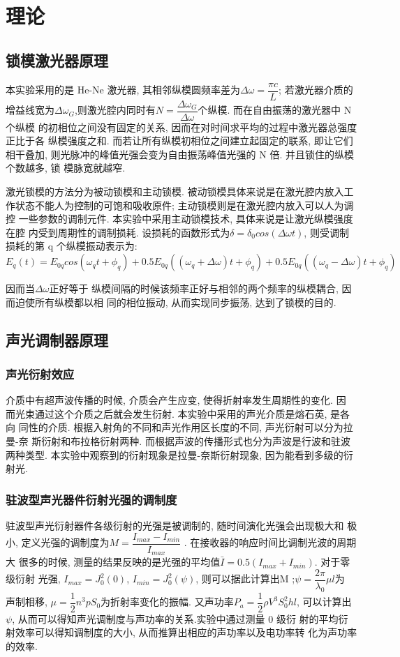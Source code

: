 \documentclass[aps,pre,12pt,preprint,%
	onecolumn,showpacs,showkeys,nofootinbib]{revtex4-2}
\begin{document}
\section{理论}
\subsection{锁模激光器原理}
本实验采用的是 He-Ne 激光器, 其相邻纵模圆频率差为$\Delta\omega=\dfrac{\pi c}{L}$; 若激光器介质的
增益线宽为$\Delta\omega_G$,则激光腔内同时有$N=\dfrac{\Delta\omega_G}{\Delta\omega}$个纵模. 而在自由振荡的激光器中 N 个纵模
的初相位之间没有固定的关系, 因而在对时间求平均的过程中激光器总强度正比于各
纵模强度之和. 而若让所有纵模初相位之间建立起固定的联系, 即让它们相干叠加,
则光脉冲的峰值光强会变为自由振荡峰值光强的 N 倍. 并且锁住的纵模个数越多, 锁
模脉宽就越窄.
\par 激光锁模的方法分为被动锁模和主动锁模. 被动锁模具体来说是在激光腔内放入工
作状态不能人为控制的可饱和吸收原件; 主动锁模则是在激光腔内放入可以人为调控
一些参数的调制元件. 本实验中采用主动锁模技术, 具体来说是让激光纵模强度在腔
内受到周期性的调制损耗. 设损耗的函数形式为$\delta=\delta_{0}cos(\Delta\omega t)$, 则受调制损耗的第 q
个纵模振动表示为:$E_{q}(t)=E_{0q}cos(\omega_q t+\phi_q)+0.5E_{0q}((\omega_q+\Delta\omega)t+\phi_q)+0.5E_{0q}((\omega_q-\Delta\omega)t+\phi_q)$
 \par 因而当$\Delta\omega$正好等于
纵模间隔的时候该频率正好与相邻的两个频率的纵模耦合, 因而迫使所有纵模都以相
同的相位振动, 从而实现同步振荡, 达到了锁模的目的.
\subsection{声光调制器原理}
\subsubsection{声光衍射效应}
介质中有超声波传播的时候, 介质会产生应变, 使得折射率发生周期性的变化. 因
而光束通过这个介质之后就会发生衍射. 本实验中采用的声光介质是熔石英, 是各向
同性的介质. 根据入射角的不同和声光作用区长度的不同, 声光衍射可以分为拉曼-奈
斯衍射和布拉格衍射两种. 而根据声波的传播形式也分为声波是行波和驻波两种类型.
本实验中观察到的衍射现象是拉曼-奈斯衍射现象, 因为能看到多级的衍射光.
\subsubsection{驻波型声光器件衍射光强的调制度}
驻波型声光衍射器件各级衍射的光强是被调制的, 随时间演化光强会出现极大和
极小, 定义光强的调制度为$M=\dfrac{I_{max}-I_{min}}{I_{max}}$
. 在接收器的响应时间比调制光波的周期大
很多的时候, 测量的结果反映的是光强的平均值$\bar{I}=0.5(I_{max}+I_{min})$. 对于零级衍射
光强, $I_{max}=J_0^2 (0)$, $I_{min}=J_0^2 (\psi)$, 则可以据此计算出M
;$\psi=\dfrac{2\pi}{\lambda_0}\mu l$为
声制相移, $\mu =\dfrac{1}{2}n^3 pS_0$为折射率变化的振幅. 又声功率$P_a=\dfrac{1}{2}\rho V^3S_0^2 hl$, 可以计算出$\psi$, 从而可以得知声光调制度与声功率的关系.实验中通过测量 0 级衍
射的平均衍射效率可以得知调制度的大小, 从而推算出相应的声功率以及电功率转
化为声功率的效率.
\end{document}
